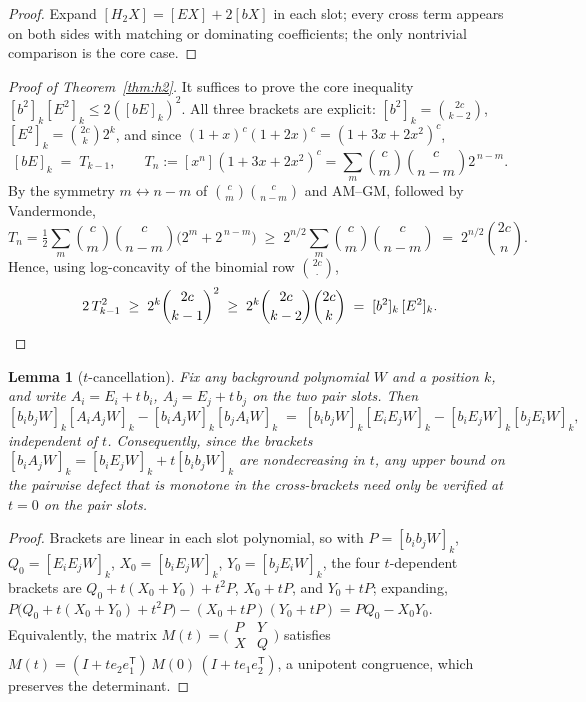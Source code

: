 \documentclass[11pt]{article}
\newtheorem{lemma}[theorem]{Lemma}
\theoremstyle{definition}
\begin{document}
\begin{proof}
Expand $[H_2X]=[EX]+2[bX]$ in each slot; every cross term appears on
both sides with matching or dominating coefficients; the only
nontrivial comparison is the core case.
\end{proof}

\begin{proof}[Proof of Theorem~\ref{thm:h2}]
It suffices to prove the core inequality
$[b^2]_k[E^2]_k\le 2([bE]_k)^2$.  All three brackets are explicit:
$[b^2]_k=\binom{2c}{k-2}$, $[E^2]_k=\binom{2c}k2^k$, and since
$(1+x)^c(1+2x)^c=(1+3x+2x^2)^c$,
\[
  [bE]_k\;=\;T_{k-1},\qquad
  T_n:=[x^n](1+3x+2x^2)^c=\sum_m\binom cm\binom c{n-m}2^{\,n-m}.
\]
By the symmetry $m\leftrightarrow n-m$ of $\binom cm\binom c{n-m}$ and
AM--GM, followed by Vandermonde,
\[
  T_n=\tfrac12\sum_m\binom cm\binom c{n-m}\bigl(2^m+2^{\,n-m}\bigr)
  \;\ge\;2^{n/2}\sum_m\binom cm\binom c{n-m}
  \;=\;2^{n/2}\binom{2c}n .
\]
Hence, using log-concavity of the binomial row $\binom{2c}\cdot$,
\[
  2\,T_{k-1}^2\;\ge\;2^{k}\binom{2c}{k-1}^2
  \;\ge\;2^{k}\binom{2c}{k-2}\binom{2c}k\;=\;[b^2]_k\,[E^2]_k. \qedhere
\]
\end{proof}

\begin{lemma}[$t$-cancellation]\label{lem:tcancel}
Fix any background polynomial $W$ and a position $k$, and write
$A_i=E_i+t\,b_i$, $A_j=E_j+t\,b_j$ on the two pair slots.  Then
\[
  [b_ib_jW]_k[A_iA_jW]_k-[b_iA_jW]_k[b_jA_iW]_k
  \;=\;[b_ib_jW]_k[E_iE_jW]_k-[b_iE_jW]_k[b_jE_iW]_k ,
\]
independent of $t$.  Consequently, since the brackets
$[b_iA_jW]_k=[b_iE_jW]_k+t[b_ib_jW]_k$ are nondecreasing in $t$, any
upper bound on the pairwise defect that is monotone in the
cross-brackets need only be verified at $t=0$ on the pair slots.
\end{lemma}

\begin{proof}
Brackets are linear in each slot polynomial, so with
$P=[b_ib_jW]_k$, $Q_0=[E_iE_jW]_k$, $X_0=[b_iE_jW]_k$,
$Y_0=[b_jE_iW]_k$, the four $t$-dependent brackets are
$Q_0+t(X_0+Y_0)+t^2P$, $X_0+tP$, and $Y_0+tP$; expanding,
$P\bigl(Q_0+t(X_0+Y_0)+t^2P\bigr)-(X_0+tP)(Y_0+tP)=PQ_0-X_0Y_0$.
Equivalently, the matrix
$M(t)=\bigl(\begin{smallmatrix}P&Y\\X&Q\end{smallmatrix}\bigr)$
satisfies $M(t)=(I+te_2e_1^{\mathsf T})\,M(0)\,(I+te_1e_2^{\mathsf T})$,
a unipotent congruence, which preserves the determinant.
\end{proof}
\end{document}
